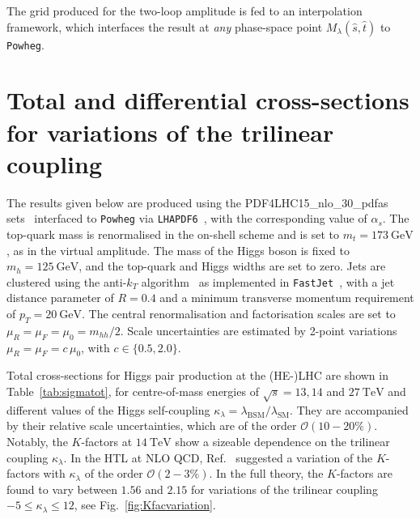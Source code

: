 \documentclass[a4paper]{jpconf}
\newcommand{\GeV}{\ensuremath{\mathrm{\:GeV}}}
\newcommand{\TeV}{\ensuremath{\mathrm{\:TeV}}}
\newcommand{\chhh}{\ensuremath{\kappa_{\lambda}}}
\begin{document}
The grid produced for the two-loop amplitude is fed to an interpolation framework, which interfaces the result at \textit{any} phase-space point $M_{\lambda}(\hat{s}, \hat{t})$ to \texttt{Powheg}.




\section{Total and differential cross-sections for variations of the trilinear coupling}

The results given below are produced using the PDF4LHC15\_nlo\_30\_pdfas sets~\cite{Butterworth:2015oua,CT14,MMHT14,NNPDF} interfaced to \texttt{Powheg} via \texttt{LHAPDF6}~\cite{Buckley:2014ana}, with the corresponding value of $\alpha_s$. The top-quark mass is renormalised in the on-shell scheme and is set to $m_t=173 \GeV$, as in the virtual amplitude. The mass of the Higgs boson is fixed to $m_h=125 \GeV$, and the top-quark and Higgs widths are set to zero. Jets are clustered using the anti-$k_T$ algorithm~\cite{Cacciari:2008gp} as implemented in \texttt{FastJet}~\cite{Cacciari:2005hq, Cacciari:2011ma}, with a jet distance parameter of $R=0.4$ and a minimum transverse momentum requirement of $p_{T} = 20 \GeV$. The central renormalisation and factorisation scales are set to $\mu_R = \mu_F = \mu_0 = m_{hh} / 2$. Scale uncertainties are estimated by 2-point variations $\mu_R = \mu_F = c\, \mu_0$, with $c \in \lbrace {0.5, 2.0} \rbrace$.

Total cross-sections for Higgs pair production at the (HE-)LHC are shown in Table~\ref{tab:sigmatot}, for centre-of-mass energies of $\sqrt{s}=13,14$ and $27 \TeV$ and different values of the Higgs self-coupling $\chhh = \lambda_{\mathrm{BSM}} / \lambda_{\mathrm{SM}}$. They are accompanied by their relative scale uncertainties, which are of the order $\mathcal{O}(10-20\%)$. Notably, the $K$-factors at $14 \TeV$ show a sizeable dependence on the trilinear coupling $\chhh$. In the HTL at NLO QCD, Ref.~\cite{Grober:2015cwa} suggested a variation of the $K$-factors with $\chhh$ of the order $\mathcal{O}(2-3\%)$. In the full theory, the $K$-factors are found to vary between $1.56$ and $2.15$ for variations of the trilinear coupling $-5 \leq \chhh \leq 12$, see Fig.~\ref{fig:Kfacvariation}. 
\end{document}

